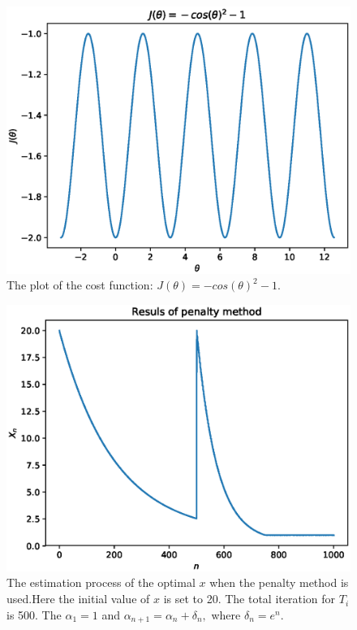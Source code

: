 \documentclass[a4paper,12pt]{article}
\begin{document}
\begin{figure}[H]
\begin{center}
\includegraphics[width=1.0\linewidth]{line_sphe.eps}


\end{center}
   \caption{The plot of the cost function: $J(\theta) = -cos(\theta)^2-1$. }
\label{fig:line_cost_sphe}
\end{figure}




\begin{figure}[H]
\begin{center}
\includegraphics[width=1.0\linewidth]{line_est.eps}


\end{center}
   \caption{The estimation process of the optimal $x$ when the penalty method is used.Here the initial value of $x$ is set to 20. The total iteration for $T_i$ is 500. The $\alpha_1 = 1$ and $\alpha _{n+1} = \alpha _n + \delta_n,$ where $\delta _ n=e^n$. }
\label{fig:line_result}
\end{figure}
\end{document}
